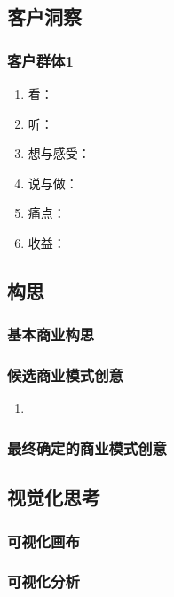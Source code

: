 \documentclass[a4paper]{ctexart}
\begin{document}
\subsection{客户洞察}

\subsubsection{客户群体1}
\begin{enumerate}[label=\alph*.]
  \item 看：
  \item 听：
  \item 想与感受：
  \item 说与做：
  \item 痛点：
  \item 收益：
\end{enumerate}


\subsection{构思}

\subsubsection{基本商业构思}

\subsubsection{候选商业模式创意}
\begin{enumerate}[label=\alph*.]
  \item 
\end{enumerate}

\subsubsection{最终确定的商业模式创意}

\subsection{视觉化思考}

\subsubsection{可视化画布}

\subsubsection{可视化分析}
\end{document}
